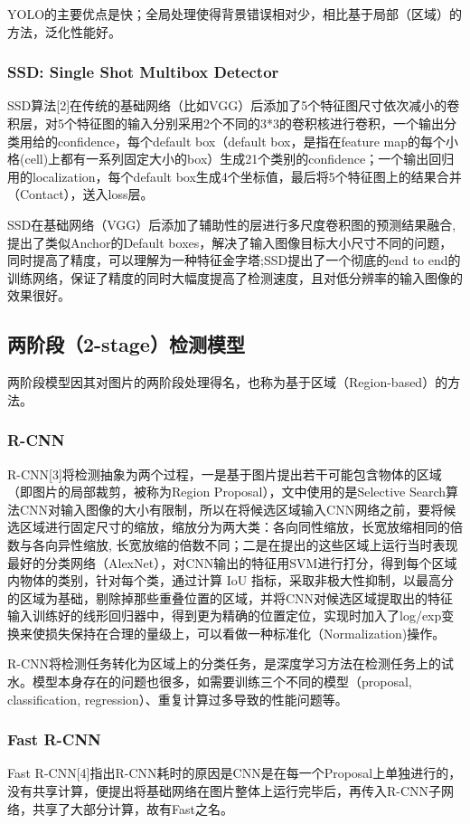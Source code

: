 \documentclass[journal,transmag]{IEEEtran}
\begin{document}
YOLO的主要优点是快；全局处理使得背景错误相对少，相比基于局部（区域）的方法，泛化性能好。
\subsubsection{SSD: Single Shot Multibox Detector}
SSD算法[2]在传统的基础网络（比如VGG）后添加了5个特征图尺寸依次减小的卷积层，对5个特征图的输入分别采用2个不同的3*3的卷积核进行卷积，一个输出分类用给的confidence，每个default box（default box，是指在feature map的每个小格(cell)上都有一系列固定大小的box）生成21个类别的confidence；一个输出回归用的localization，每个default box生成4个坐标值，最后将5个特征图上的结果合并（Contact），送入loss层。

SSD在基础网络（VGG）后添加了辅助性的层进行多尺度卷积图的预测结果融合,提出了类似Anchor的Default boxes，解决了输入图像目标大小尺寸不同的问题，同时提高了精度，可以理解为一种特征金字塔;SSD提出了一个彻底的end to end的训练网络，保证了精度的同时大幅度提高了检测速度，且对低分辨率的输入图像的效果很好。
\subsection{两阶段（2-stage）检测模型}
两阶段模型因其对图片的两阶段处理得名，也称为基于区域（Region-based）的方法。
\subsubsection{R-CNN}
R-CNN[3]将检测抽象为两个过程，一是基于图片提出若干可能包含物体的区域（即图片的局部裁剪，被称为Region Proposal），文中使用的是Selective Search算法CNN对输入图像的大小有限制，所以在将候选区域输入CNN网络之前，要将候选区域进行固定尺寸的缩放，缩放分为两大类：各向同性缩放，长宽放缩相同的倍数与各向异性缩放, 长宽放缩的倍数不同；二是在提出的这些区域上运行当时表现最好的分类网络（AlexNet），对CNN输出的特征用SVM进行打分，得到每个区域内物体的类别，针对每个类，通过计算 IoU 指标，采取非极大性抑制，以最高分的区域为基础，剔除掉那些重叠位置的区域，并将CNN对候选区域提取出的特征输入训练好的线形回归器中，得到更为精确的位置定位，实现时加入了log/exp变换来使损失保持在合理的量级上，可以看做一种标准化（Normalization)操作。

R-CNN将检测任务转化为区域上的分类任务，是深度学习方法在检测任务上的试水。模型本身存在的问题也很多，如需要训练三个不同的模型（proposal, classification, regression）、重复计算过多导致的性能问题等。
\subsubsection{Fast R-CNN}
Fast R-CNN[4]指出R-CNN耗时的原因是CNN是在每一个Proposal上单独进行的，没有共享计算，便提出将基础网络在图片整体上运行完毕后，再传入R-CNN子网络，共享了大部分计算，故有Fast之名。
\end{document}
